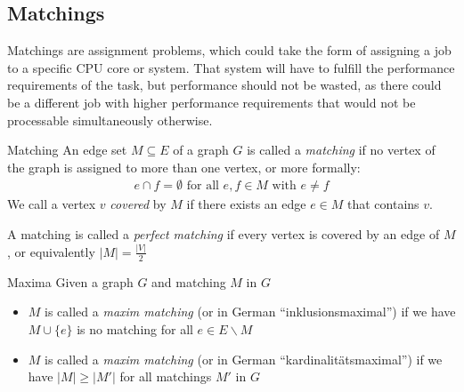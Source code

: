 \newpage
\subsection{Matchings}
Matchings are assignment problems, which could take the form of assigning a job to a specific CPU core or system.
That system will have to fulfill the performance requirements of the task, but performance should not be wasted, as there could be a different job with higher performance requirements that would not be processable simultaneously otherwise.

\begin{definition}[]{Matching}
    An edge set $M \subseteq E$ of a graph $G$ is called a \textit{matching} if no vertex of the graph is assigned to more than one vertex, or more formally:
    \begin{align*}
        e \cap f = \emptyset \text{ for all } e, f \in M \text{ with } e \neq f
    \end{align*}
    We call a vertex $v$ \textit{covered} by $M$ if there exists an edge $e \in M$ that contains $v$.

    A matching is called a \textit{perfect matching} if every vertex is covered by an edge of $M$, or equivalently $|M| = \frac{|V|}{2}$
\end{definition}

\begin{definition}[]{Maxima}
    Given a graph $G$ and matching $M$ in $G$
    \begin{itemize}
        \item $M$ is called a \textit{maxim matching} (or in German ``inklusionsmaximal'') if we have $M \cup \{e\}$ is no matching for all $e \in E \backslash M$
        \item $M$ is called a \textit{maxim matching} (or in German ``kardinalitätsmaximal'') if we have $|M| \geq |M'|$ for all matchings $M'$ in $G$
    \end{itemize}
\end{definition}


